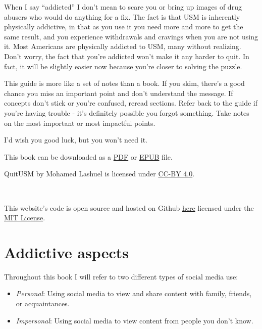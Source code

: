 \documentclass[
  openany]{book}
\providecommand{\tightlist}{%
  \setlength{\itemsep}{0pt}\setlength{\parskip}{0pt}}
\begin{document}
When I say ``addicted'' I don't mean to scare you or bring up images of drug abusers who would do anything for a fix. The fact is that USM is inherently physically addictive, in that as you use it you need more and more to get the same result, and you experience withdrawals and cravings when you are not using it. Most Americans are physically addicted to USM, many without realizing. Don't worry, the fact that you're addicted won't make it any harder to quit. In fact, it will be slightly easier now because you're closer to solving the puzzle.

This guide is more like a set of notes than a book. If you skim, there's a good chance you miss an important point and don't understand the message. If concepts don't stick or you're confused, reread sections. Refer back to the guide if you're having trouble - it's definitely possible you forgot something. Take notes on the most important or most impactful points.

I'd wish you good luck, but you won't need it.

This book can be downloaded as a \href{_main.pdf}{PDF} or \href{_main.epub}{EPUB} file.

QuitUSM by Mohamed Lashuel is licensed under \href{https://creativecommons.org/licenses/by/4.0/}{CC-BY 4.0}.

\includegraphics[width=0in,height=\textheight,keepaspectratio]{images/cc.png}

This website's code is open source and hosted on Github \href{https://github.com/MohamedLashuel/QuitUSM/}{here} licensed under the \href{https://github.com/MohamedLashuel/QuitUSM/blob/main/LICENSE}{MIT License}.

\chapter{Addictive aspects}\label{why-addictive}

Throughout this book I will refer to two different types of social media use:

\begin{itemize}
\tightlist
\item
  \emph{Personal}: Using social media to view and share content with family, friends, or acquaintances.
\item
  \emph{Impersonal}: Using social media to view content from people you don't know.
\end{itemize}
\end{document}
